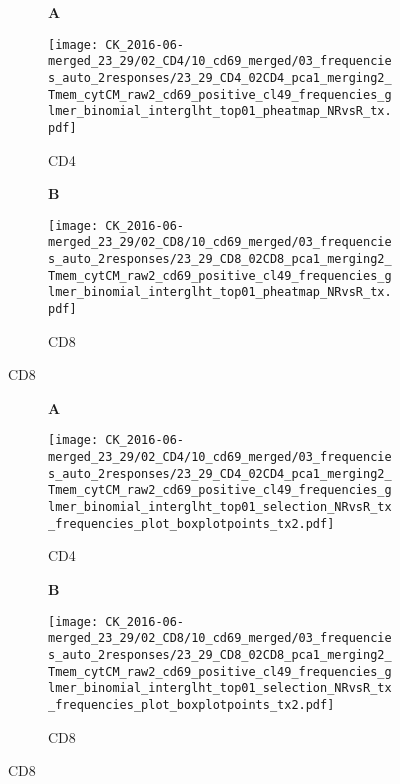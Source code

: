 \documentclass[a4paper, 12pt]{article}
\begin{document}
\begin{figure}[!thb]
\centering
    \caption{Significant cytokine combinations for TX (adjusted p-value $<$ 0.1)}
    \begin{subfigure}[t]{0.02\textwidth}
    \vskip 0pt
        \textbf{\textsf{\normalsize A}}
    \end{subfigure}
    \begin{subfigure}[t]{0.45\textwidth}
    \vskip 0pt
    \caption{CD4}
        \texttt{[image: CK\_2016-06-merged\_23\_29/02\_CD4/10\_cd69\_merged/03\_frequencies\_auto\_2responses/23\_29\_CD4\_02CD4\_pca1\_merging2\_Tmem\_cytCM\_raw2\_cd69\_positive\_cl49\_frequencies\_glmer\_binomial\_interglht\_top01\_pheatmap\_NRvsR\_tx.pdf]}
    \end{subfigure}
\quad
    \begin{subfigure}[t]{0.02\textwidth}
    \vskip 0pt
        \textbf{\textsf{\normalsize B}}
    \end{subfigure}
    \begin{subfigure}[t]{0.45\textwidth}
    \vskip 0pt
    \caption{CD8}
        \texttt{[image: CK\_2016-06-merged\_23\_29/02\_CD8/10\_cd69\_merged/03\_frequencies\_auto\_2responses/23\_29\_CD8\_02CD8\_pca1\_merging2\_Tmem\_cytCM\_raw2\_cd69\_positive\_cl49\_frequencies\_glmer\_binomial\_interglht\_top01\_pheatmap\_NRvsR\_tx.pdf]}
    \end{subfigure}
    
    
\end{figure}


\begin{figure}[!thb]
\centering

    \caption{}
    \begin{subfigure}[t]{0.02\textwidth}
    \vskip 0pt
        \textbf{\textsf{\normalsize A}}
    \end{subfigure}
    \begin{subfigure}[t]{0.45\textwidth}
    \vskip 0pt
    \caption{CD4}
        \texttt{[image: CK\_2016-06-merged\_23\_29/02\_CD4/10\_cd69\_merged/03\_frequencies\_auto\_2responses/23\_29\_CD4\_02CD4\_pca1\_merging2\_Tmem\_cytCM\_raw2\_cd69\_positive\_cl49\_frequencies\_glmer\_binomial\_interglht\_top01\_selection\_NRvsR\_tx\_frequencies\_plot\_boxplotpoints\_tx2.pdf]}
    \end{subfigure}
\quad
    \begin{subfigure}[t]{0.02\textwidth}
    \vskip 0pt
        \textbf{\textsf{\normalsize B}}
    \end{subfigure}
    \begin{subfigure}[t]{0.45\textwidth}
    \vskip 0pt
    \caption{CD8}
        \texttt{[image: CK\_2016-06-merged\_23\_29/02\_CD8/10\_cd69\_merged/03\_frequencies\_auto\_2responses/23\_29\_CD8\_02CD8\_pca1\_merging2\_Tmem\_cytCM\_raw2\_cd69\_positive\_cl49\_frequencies\_glmer\_binomial\_interglht\_top01\_selection\_NRvsR\_tx\_frequencies\_plot\_boxplotpoints\_tx2.pdf]}
    \end{subfigure}
    
\end{figure}
\end{document}
